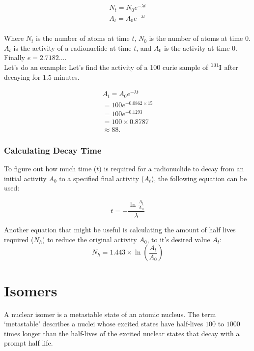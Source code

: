 \documentclass{article}
\begin{document}
\begin{multicols*}{2}
    \begin{equation*}
      \begin{split}
        N_t = N_{0}e^{-\lambda{t}} \\
        A_t = A_{0}e^{-\lambda{t}} \\
      \end{split}
    \end{equation*}

    Where $N_t$ is the number of atoms at time $t$, $N_0$ is the number
    of atoms at time $0$. $A_t$ is the activity of a radionuclide at time $t$,
    and $A_0$ is the activity at time $0$. Finally $e = 2.7182\ldots$.\\

    Let's do an example: Let's find the activity of a 100 curie sample of
    $\ce{^{131}I}$ after decaying for $1.5$ minutes.

    \begin{equation*}
      \begin{split}
        A_t = A_{0}e^{-\lambda{t}} \\
        = 100e^{-0.0862 \times 15} \\
        = 100e^{-0.1293} \\
        = 100 \times 0.8787 \\
        \approx 88.
      \end{split}
    \end{equation*}

    \subsubsection{Calculating Decay Time}
    To figure out how much time ($t$) is required for a radionuclide to decay
    from an initial activity $A_0$ to a specified final activity ($A_t$), the
    following equation can be used:

    \[
      t = -\frac{\ln{\frac{A_t}{A_0}}}{\lambda}
    \]

    Another equation that might be useful is calculating the amount of half lives
    required ($N_h$) to reduce the original activity $A_0$, to it's desired value $A_t$:
    \[
      N_h = 1.443 \times \ln{\left( \frac{A_t}{A_0} \right)}
    \]

    \section{Isomers}
    A nuclear isomer is a metastable state of an atomic nucleus. The term
    `metastable' describes a nuclei whose excited states have half-lives $100$
    to $1000$ times longer than the half-lives of the excited nuclear states
    that decay with a prompt half life.\\


\end{multicols*}
\end{document}
